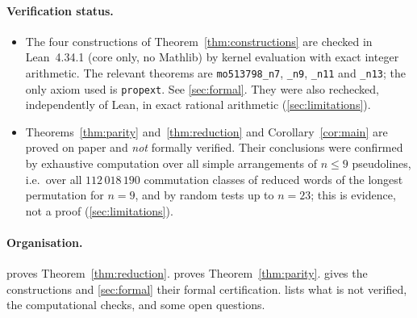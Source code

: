 \paragraph{Verification status.}
\begin{itemize}
\item The four constructions of Theorem~\ref{thm:constructions} are checked in Lean~4.34.1 (core only, no
  Mathlib) by kernel evaluation with exact integer arithmetic. The relevant theorems are
  \texttt{mo513798\_n7}, \texttt{\_n9}, \texttt{\_n11} and \texttt{\_n13}; the only axiom used is
  \texttt{propext}. See \cref{sec:formal}. They were also rechecked, independently of Lean, in exact
  rational arithmetic (\cref{sec:limitations}).
\item Theorems~\ref{thm:parity} and~\ref{thm:reduction} and Corollary~\ref{cor:main} are proved on paper
  and \emph{not} formally verified. Their conclusions were confirmed by exhaustive computation over all
  simple arrangements of $n\le 9$ pseudolines, i.e.\ over all $112\,018\,190$ commutation classes of
  reduced words of the longest permutation for $n=9$, and by random tests up to $n=23$; this is
  evidence, not a proof (\cref{sec:limitations}).
\end{itemize}

\paragraph{Organisation.}  proves Theorem~\ref{thm:reduction}.  proves
Theorem~\ref{thm:parity}.  gives the constructions and \cref{sec:formal} their formal
certification.  lists what is not verified, the computational checks, and some open
questions.
